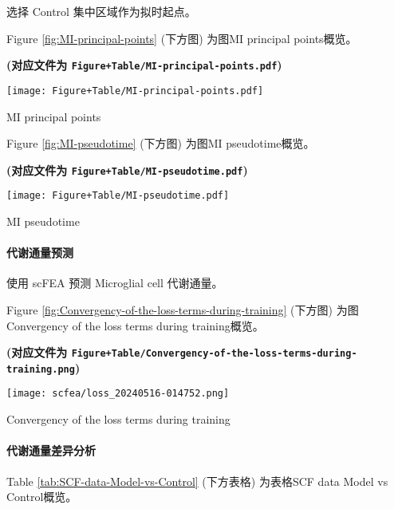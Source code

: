 \documentclass[
]{article}
\begin{document}
选择 Control 集中区域作为拟时起点。

Figure \ref{fig:MI-principal-points} (下方图) 为图MI principal points概览。

\textbf{(对应文件为 \texttt{Figure+Table/MI-principal-points.pdf})}

\def\@captype{figure}
\begin{center}
\texttt{[image: Figure+Table/MI-principal-points.pdf]}
\caption{MI principal points}\label{fig:MI-principal-points}
\end{center}

Figure \ref{fig:MI-pseudotime} (下方图) 为图MI pseudotime概览。

\textbf{(对应文件为 \texttt{Figure+Table/MI-pseudotime.pdf})}

\def\@captype{figure}
\begin{center}
\texttt{[image: Figure+Table/MI-pseudotime.pdf]}
\caption{MI pseudotime}\label{fig:MI-pseudotime}
\end{center}

\hypertarget{ux4ee3ux8c22ux901aux91cfux9884ux6d4b}{%
\paragraph{代谢通量预测}\label{ux4ee3ux8c22ux901aux91cfux9884ux6d4b}}

使用 scFEA 预测 Microglial cell 代谢通量。

Figure \ref{fig:Convergency-of-the-loss-terms-during-training} (下方图) 为图Convergency of the loss terms during training概览。

\textbf{(对应文件为 \texttt{Figure+Table/Convergency-of-the-loss-terms-during-training.png})}

\def\@captype{figure}
\begin{center}
\texttt{[image: scfea/loss\_20240516-014752.png]}
\caption{Convergency of the loss terms during training}\label{fig:Convergency-of-the-loss-terms-during-training}
\end{center}

\hypertarget{ux4ee3ux8c22ux901aux91cfux5deeux5f02ux5206ux6790}{%
\paragraph{代谢通量差异分析}\label{ux4ee3ux8c22ux901aux91cfux5deeux5f02ux5206ux6790}}

Table \ref{tab:SCF-data-Model-vs-Control} (下方表格) 为表格SCF data Model vs Control概览。
\end{document}
